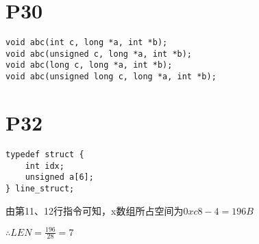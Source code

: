\documentclass{article}
\begin{document}
\section{P30}
\begin{lstlisting}
void abc(int c, long *a, int *b);
void abc(unsigned c, long *a, int *b);
void abc(long c, long *a, int *b);
void abc(unsigned long c, long *a, int *b);
\end{lstlisting}

\section{P32}
\begin{lstlisting}
typedef struct {
	int idx;
	unsigned a[6];
} line_struct;
\end{lstlisting}

由第11、12行指令可知，x数组所占空间为$0xc8-4=196B$

$\therefore LEN=\frac{196}{28}=7$
\end{document}

